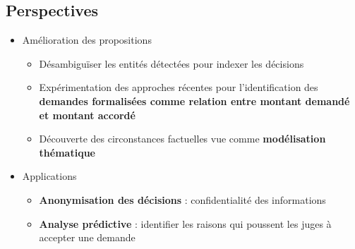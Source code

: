 \subsection{Perspectives}
\begin{frame}[c]{\mysubsectiontitle}

	\begin{itemize} \scriptsize
		\item Amélioration des propositions 
		\begin{itemize}  \scriptsize
			\item Désambiguïser les entités détectées pour indexer les décisions
			\item Expérimentation des approches récentes pour l'identification des \textbf{demandes formalisées comme relation entre montant demandé et montant accordé}
			\item Découverte des circonstances factuelles vue comme \textbf{modélisation thématique}
		\end{itemize}
		\item Applications
		\begin{itemize}  \scriptsize
			\item \textbf{Anonymisation des décisions} : confidentialité des informations
			\item \textbf{Analyse prédictive} : identifier les raisons qui poussent les juges à accepter une demande
		\end{itemize}
	\end{itemize}
\end{frame}